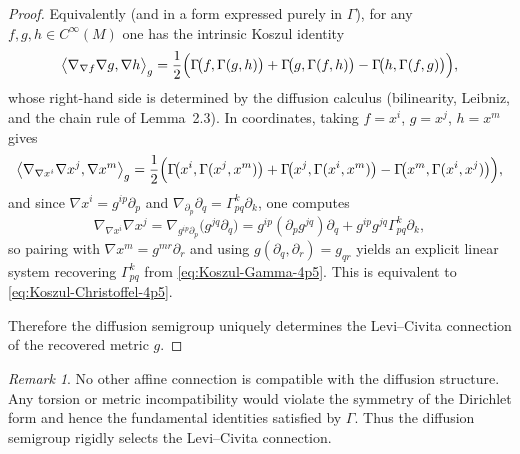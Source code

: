 \documentclass[11pt]{amsart}
\theoremstyle{definition}
\theoremstyle{remark}
\newtheorem{remark}[theorem]{Remark}
\begin{document}
\begin{proof}
Equivalently (and in a form expressed purely in $\Gamma$), for any $f,g,h\in C^\infty(M)$ one has the
intrinsic Koszul identity
\begin{equation}\label{eq:Koszul-Gamma-4p5}
\bigl\langle \nabla_{\nabla f}\nabla g,\nabla h\bigr\rangle_g
=\frac12\Bigl(\Gamma\!\bigl(f,\Gamma(g,h)\bigr)+\Gamma\!\bigl(g,\Gamma(f,h)\bigr)-\Gamma\!\bigl(h,\Gamma(f,g)\bigr)\Bigr),
\end{equation}
whose right-hand side is determined by the diffusion calculus (bilinearity, Leibniz, and the chain rule
of Lemma~2.3). In coordinates, taking $f=x^i$, $g=x^j$, $h=x^m$ gives
\[
\bigl\langle \nabla_{\nabla x^i}\nabla x^j,\nabla x^m\bigr\rangle_g
=\frac12\Bigl(\Gamma\!\bigl(x^i,\Gamma(x^j,x^m)\bigr)+\Gamma\!\bigl(x^j,\Gamma(x^i,x^m)\bigr)
-\Gamma\!\bigl(x^m,\Gamma(x^i,x^j)\bigr)\Bigr),
\]
and since $\nabla x^i=g^{ip}\partial_p$ and $\nabla_{\partial_p}\partial_q=\Gamma^k_{pq}\partial_k$, one computes
\[
\nabla_{\nabla x^i}\nabla x^j
=\nabla_{g^{ip}\partial_p}\bigl(g^{jq}\partial_q\bigr)
=g^{ip}(\partial_p g^{jq})\partial_q+g^{ip}g^{jq}\Gamma^k_{pq}\partial_k,
\]
so pairing with $\nabla x^m=g^{mr}\partial_r$ and using $g(\partial_q,\partial_r)=g_{qr}$ yields an explicit linear system
recovering $\Gamma^k_{pq}$ from \eqref{eq:Koszul-Gamma-4p5}. This is equivalent to \eqref{eq:Koszul-Christoffel-4p5}.

Therefore the diffusion semigroup uniquely determines the Levi--Civita connection of the recovered metric $g$.
\end{proof}


\begin{remark}
No other affine connection is compatible with the diffusion structure.
Any torsion or metric incompatibility would violate the symmetry of the
Dirichlet form and hence the fundamental identities satisfied by $\Gamma$.
Thus the diffusion semigroup rigidly selects the Levi--Civita connection.
\end{remark}
\end{document}
